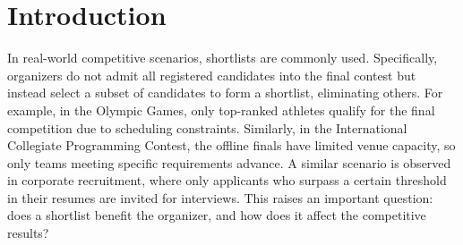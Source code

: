 \section{Introduction}
\label{sec:intro}



In real-world competitive scenarios, shortlists are commonly used. Specifically, organizers do not admit all registered candidates into the final contest but instead select a subset of candidates to form a shortlist, eliminating others. For example, in the Olympic Games, only top-ranked athletes qualify for the final competition due to scheduling constraints. Similarly, in the International Collegiate Programming Contest, the offline finals have limited venue capacity, so only teams meeting specific requirements advance. A similar scenario is observed in corporate recruitment, where only applicants who surpass a certain threshold in their resumes are invited for interviews.
This raises an important question: does a shortlist benefit the organizer, and how does it affect the competitive results?

